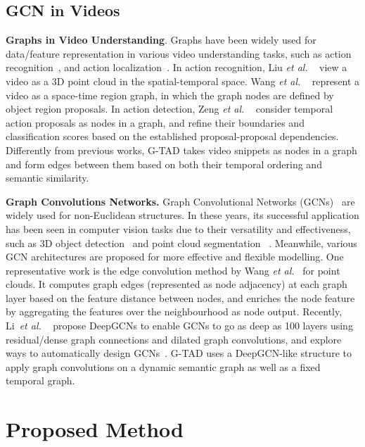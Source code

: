 \documentclass[10pt,twocolumn,letterpaper]{article}
\begin{document}
\subsection{GCN in Videos}
\noindent \textbf{Graphs in Video Understanding}. Graphs have been widely used for data/feature representation in various video understanding tasks, such as
action recognition~\cite{liu2019learning, wang2018videos, chen2019graph}, and action localization~\cite{zeng2019graph}.
In action recognition, Liu \textit{et al.} ~\cite{liu2019learning} view a video as a 3D point cloud in the spatial-temporal space.
Wang \textit{et al.} ~\cite{wang2018videos} represent a video as a space-time region graph, in which the graph nodes are defined by object region proposals. In action detection, Zeng \textit{et al.} ~\cite{zeng2019graph} consider temporal action proposals as nodes in a graph, and refine their boundaries and classification scores based on the established proposal-proposal dependencies. Differently from previous works, G-TAD takes video snippets as nodes in a graph and form edges between them based on both their temporal ordering and  semantic similarity. 

\noindent
\textbf{Graph Convolutions Networks.}
Graph Convolutional Networks (GCNs)~\cite{kipf2016semi} are widely used for non-Euclidean structures. In these years, its successful application has been seen in computer vision tasks due to their versatility and effectiveness, such as 3D object detection~\cite{Gkioxari2019Mesh} and point cloud segmentation ~\cite{wang2018dynamic, xie2019clouds}.  
Meanwhile, various GCN architectures are proposed for more effective and flexible modelling. 
One representative work is the edge convolution method by {Wang}
\textit{et al.}~\cite{wang2018dynamic} for point clouds. It computes graph edges (represented as node adjacency) at each graph layer based on the feature distance between nodes, and enriches the node feature by aggregating the features over the neighbourhood as node output.
Recently, Li~\textit{et al.} ~\cite{Li_2019_ICCV,li2019deepgcns_journal} propose DeepGCNs to enable GCNs to go as deep as 100 layers using residual/dense graph connections and dilated graph convolutions, and explore ways to automatically design GCNs~\cite{li2019sgas}.  G-TAD uses a DeepGCN-like structure to apply graph convolutions on a dynamic semantic graph as well as a fixed temporal graph.



%
 \section{Proposed Method}
\end{document}
